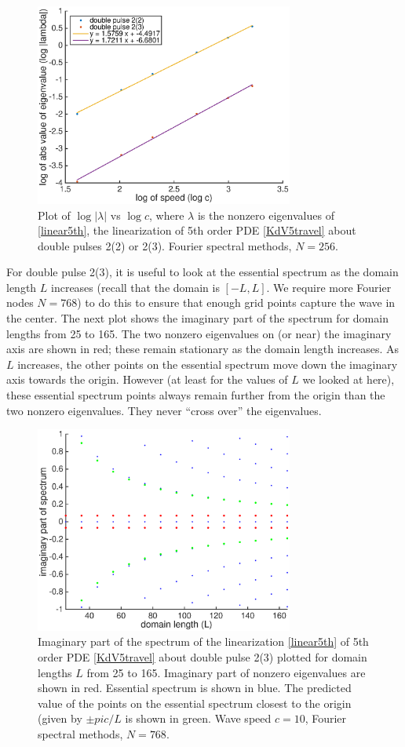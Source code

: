 \documentclass[12pt]{article}
\begin{document}
\begin{figure}[H]
	\includegraphics[width=8.5cm]{eigvsspeed}
	\caption{Plot of $\log{|\lambda|}$ vs $\log{c}$, where $\lambda$ is the nonzero eigenvalues of \eqref{linear5th}, the linearization of 5th order PDE \eqref{KdV5travel} about double pulses 2(2) or 2(3). Fourier spectral methods, $N = 256$.}
\end{figure}

For double pulse 2(3), it is useful to look at the essential spectrum as the domain length $L$ increases (recall that the domain is $[-L, L]$. We require more Fourier nodes $N = 768$) to do this to ensure that enough grid points capture the wave in the center. The next plot shows the imaginary part of the spectrum for domain lengths from 25 to 165. The two nonzero eigenvalues on (or near) the imaginary axis are shown in red; these remain stationary as the domain length increases. As $L$ increases, the other points on the essential spectrum move down the imaginary axis towards the origin. However (at least for the values of $L$ we looked at here), these essential spectrum points always remain further from the origin than the two nonzero eigenvalues. They never ``cross over'' the eigenvalues.

\begin{figure}[H]
	\includegraphics[width=8.5cm]{essspecL}
	\caption{Imaginary part of the spectrum of the linearization \eqref{linear5th} of 5th order PDE \eqref{KdV5travel} about double pulse 2(3) plotted for domain lengths $L$ from 25 to 165. Imaginary part of nonzero eigenvalues are shown in red. Essential spectrum is shown in blue. The predicted value of the points on the essential spectrum closest to the origin (given by $\pm pi c/L$ is shown in green. Wave speed $c = 10$, Fourier spectral methods, $N = 768$.}
\end{figure}
\end{document}
